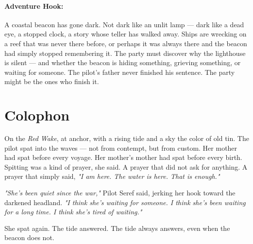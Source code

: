 \paragraph{Adventure Hook:}
A coastal beacon has gone dark. Not dark like an unlit lamp — dark like a dead eye, a stopped clock, a story whose teller has walked away. Ships are wrecking on a reef that was never there before, or perhaps it was always there and the beacon had simply stopped remembering it. The party must discover why the lighthouse is silent — and whether the beacon is hiding something, grieving something, or waiting for someone. The pilot's father never finished his sentence. The party might be the ones who finish it.

\section*{Colophon}
On the \textit{Red Wake}, at anchor, with a rising tide and a sky the color of old tin. The pilot spat into the waves — not from contempt, but from custom. Her mother had spat before every voyage. Her mother's mother had spat before every birth. Spitting was a kind of prayer, she said. A prayer that did not ask for anything. A prayer that simply said, \textit{"I am here. The water is here. That is enough."}

\textit{"She's been quiet since the war,"} Pilot Seref said, jerking her hook toward the darkened headland. \textit{"I think she's waiting for someone. I think she's been waiting for a long time. I think she's tired of waiting."}

She spat again. The tide answered. The tide always answers, even when the beacon does not.